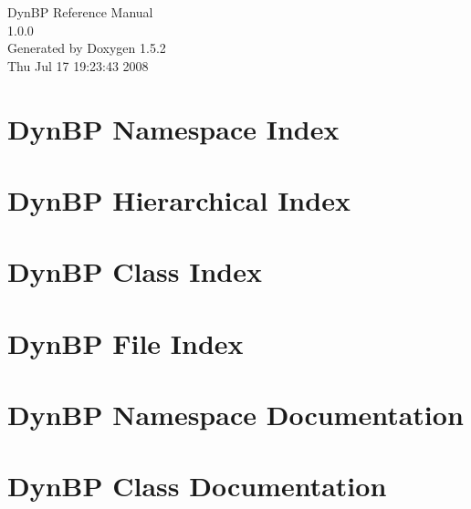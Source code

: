 \documentclass[a4paper]{book}
\begin{document}
\begin{titlepage}
\vspace*{7cm}
\begin{center}
{\Large DynBP Reference Manual\\[1ex]\large 1.0.0 }\\
\vspace*{1cm}
{\large Generated by Doxygen 1.5.2}\\
\vspace*{0.5cm}
{\small Thu Jul 17 19:23:43 2008}\\
\end{center}
\end{titlepage}
\clearemptydoublepage
{}
\tableofcontents
\clearemptydoublepage
{}
\chapter{DynBP Namespace Index}

\chapter{DynBP Hierarchical Index}

\chapter{DynBP Class Index}

\chapter{DynBP File Index}

\chapter{DynBP Namespace Documentation}



\chapter{DynBP Class Documentation}














































\end{document}
